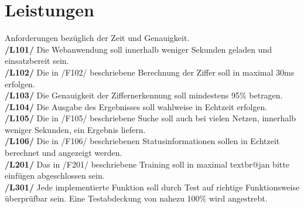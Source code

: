 \section{Leistungen}
Anforderungen bezüglich der Zeit und Genauigkeit. \\[-0.2cm]

\textbf{/L101/} Die Webanwendung soll innerhalb weniger Sekunden geladen und einsatzbereit sein. \\[-0.2cm]

\textbf{/L102/} Die in /F102/ beschriebene Berechnung der Ziffer soll in maximal 30ms erfolgen.\\[-0.2cm]

\textbf{/L103/} Die Genauigkeit der Ziffernerkennung soll mindestens 95\% betragen.\\[-0.2cm]

\textbf{/L104/} Die Ausgabe des Ergebnisses soll wahlweise in Echtzeit erfolgen.\\[-0.2cm]

\textbf{/L105/} Die in /F105/ beschriebene Suche soll auch bei vielen Netzen, innerhalb weniger Sekunden, ein Ergebnis liefern.\\[-0.2cm]

\textbf{/L106/} Die in /F106/ beschriebenen Statusinformationen sollen in Echtzeit berechnet und angezeigt werden.\\[-0.2cm]

\textbf{/L201/} Das in /F201/ beschriebene Training soll in maximal textbr{@jan bitte einfügen} abgeschlossen sein.\\[-0.2cm]

\textbf{/L301/} Jede implementierte Funktion soll durch Test auf richtige Funktionsweise überprüfbar sein. Eine Testabdeckung von nahezu 100\% wird angestrebt.\\[-0.2cm]
